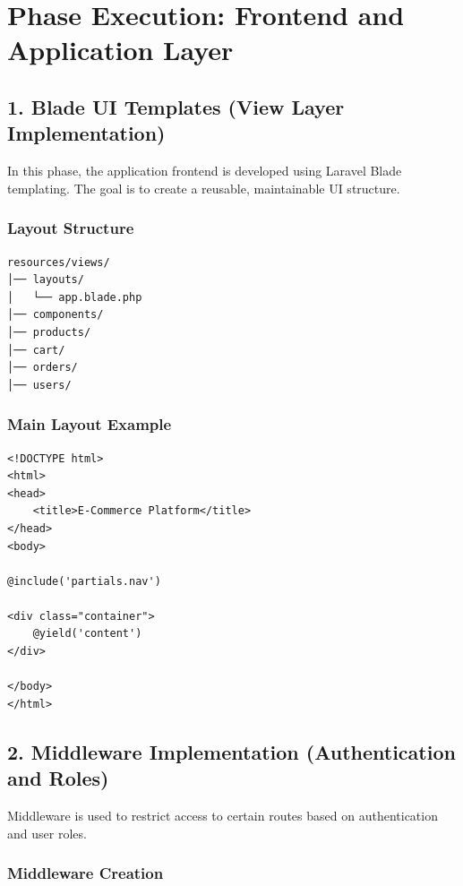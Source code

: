 \documentclass[12pt,a4paper]{article}
\begin{document}
\section{Phase Execution: Frontend and Application Layer}

\subsection{1. Blade UI Templates (View Layer Implementation)}

In this phase, the application frontend is developed using Laravel Blade templating. The goal is to create a reusable, maintainable UI structure.

\subsubsection{Layout Structure}

\begin{verbatim}
resources/views/
│── layouts/
│   └── app.blade.php
│── components/
│── products/
│── cart/
│── orders/
│── users/
\end{verbatim}

\subsubsection{Main Layout Example}

\begin{verbatim}
<!DOCTYPE html>
<html>
<head>
    <title>E-Commerce Platform</title>
</head>
<body>

@include('partials.nav')

<div class="container">
    @yield('content')
</div>

</body>
</html>
\end{verbatim}

\subsection{2. Middleware Implementation (Authentication and Roles)}

Middleware is used to restrict access to certain routes based on authentication and user roles.

\subsubsection{Middleware Creation}
\end{document}
